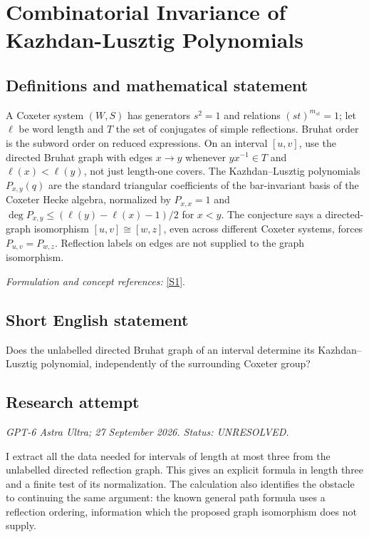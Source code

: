 \documentclass[11pt]{article}
\begin{document}
\section*{\texorpdfstring{Combinatorial Invariance of Kazhdan-Lusztig Polynomials}{Combinatorial Invariance of Kazhdan-Lusztig Polynomials}}\label{423}
\subsection{Definitions and mathematical statement}
A Coxeter system $(W,S)$ has generators $s^2=1$ and relations $(st)^{m_{st}}=1$; let $\ell$ be word length and $T$ the set of conjugates of simple reflections. Bruhat order is the subword order on reduced expressions. On an interval $[u,v]$, use the directed Bruhat graph with edges $x\to y$ whenever $yx^{-1}\in T$ and $\ell(x)<\ell(y)$, not just length-one covers. The Kazhdan--Lusztig polynomials $P_{x,y}(q)$ are the standard triangular coefficients of the bar-invariant basis of the Coxeter Hecke algebra, normalized by $P_{x,x}=1$ and $\deg P_{x,y}\le(\ell(y)-\ell(x)-1)/2$ for $x<y$. The conjecture says a directed-graph isomorphism $[u,v]\cong[w,z]$, even across different Coxeter systems, forces $P_{u,v}=P_{w,z}$. Reflection labels on edges are not supplied to the graph isomorphism.
\par\smallskip\textit{Formulation and concept references:} \href{https://link.springer.com/article/10.1007/s00029-024-00972-0}{[S1]}.

\subsection{Short English statement}
Does the unlabelled directed Bruhat graph of an interval determine its Kazhdan--Lusztig polynomial, independently of the surrounding Coxeter group?
\subsection{Research attempt}
\textit{GPT-6 Astra Ultra; 27 September 2026. Status: UNRESOLVED.}

I extract all the data needed for intervals of length at most three
from the unlabelled directed reflection graph. This gives an explicit
formula in length three and a finite test of its normalization. The
calculation also identifies the obstacle to continuing the same argument:
the known general path formula uses a reflection ordering, information
which the proposed graph isomorphism does not supply.
\end{document}
